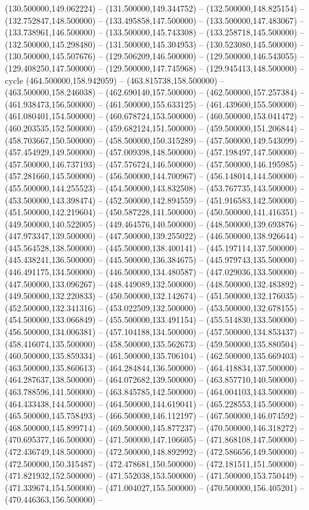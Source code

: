    (130.500000,149.062224) -- (131.500000,149.344752) -- (132.500000,148.825154) -- (132.752847,148.500000) -- (133.495858,147.500000) -- (133.500000,147.483067) -- (133.738961,146.500000) -- (133.500000,145.743308) -- (133.258718,145.500000) -- (132.500000,145.298480) -- (131.500000,145.304953) -- (130.523080,145.500000) -- (130.500000,145.507676) -- (129.506209,146.500000) -- (129.500000,146.543055) -- (129.408250,147.500000) -- (129.500000,147.745968) -- (129.945413,148.500000) -- cycle
   (464.500000,158.942059) -- (463.815738,158.500000) -- (463.500000,158.246038) -- (462.690140,157.500000) -- (462.500000,157.257384) -- (461.938473,156.500000) -- (461.500000,155.633125) -- (461.439600,155.500000) -- (461.080401,154.500000) -- (460.678724,153.500000) -- (460.500000,153.041472) -- (460.203535,152.500000) -- (459.682124,151.500000) -- (459.500000,151.206844) -- (458.703667,150.500000) -- (458.500000,150.315289) -- (457.500000,149.543099) -- (457.454929,149.500000) -- (457.009398,148.500000) -- (457.198497,147.500000) -- (457.500000,146.737193) -- (457.576724,146.500000) -- (457.500000,146.195985) -- (457.281660,145.500000) -- (456.500000,144.700967) -- (456.148014,144.500000) -- (455.500000,144.255523) -- (454.500000,143.832508) -- (453.767735,143.500000) -- (453.500000,143.398474) -- (452.500000,142.894559) -- (451.916583,142.500000) -- (451.500000,142.219604) -- (450.587228,141.500000) -- (450.500000,141.416351) -- (449.500000,140.522005) -- (449.464576,140.500000) -- (448.500000,139.693876) -- (447.973347,139.500000) -- (447.500000,139.255022) -- (446.500000,138.926644) -- (445.564528,138.500000) -- (445.500000,138.400141) -- (445.197114,137.500000) -- (445.438241,136.500000) -- (445.500000,136.384675) -- (445.979743,135.500000) -- (446.491175,134.500000) -- (446.500000,134.480587) -- (447.029036,133.500000) -- (447.500000,133.096267) -- (448.449089,132.500000) -- (448.500000,132.483892) -- (449.500000,132.220833) -- (450.500000,132.142674) -- (451.500000,132.176035) -- (452.500000,132.341316) -- (453.022509,132.500000) -- (453.500000,132.678155) -- (454.500000,133.066849) -- (455.500000,133.491154) -- (455.514830,133.500000) -- (456.500000,134.006381) -- (457.104188,134.500000) -- (457.500000,134.853437) -- (458.416074,135.500000) -- (458.500000,135.562673) -- (459.500000,135.880504) -- (460.500000,135.859334) -- (461.500000,135.706104) -- (462.500000,135.669403) -- (463.500000,135.860613) -- (464.284844,136.500000) -- (464.418834,137.500000) -- (464.287637,138.500000) -- (464.072682,139.500000) -- (463.857710,140.500000) -- (463.788596,141.500000) -- (463.845785,142.500000) -- (464.004103,143.500000) -- (464.433438,144.500000) -- (464.500000,144.619041) -- (465.228553,145.500000) -- (465.500000,145.758493) -- (466.500000,146.112197) -- (467.500000,146.074592) -- (468.500000,145.899714) -- (469.500000,145.877237) -- (470.500000,146.318272) -- (470.695377,146.500000) -- (471.500000,147.106605) -- (471.868108,147.500000) -- (472.436749,148.500000) -- (472.500000,148.892992) -- (472.586656,149.500000) -- (472.500000,150.315487) -- (472.478681,150.500000) -- (472.181511,151.500000) -- (471.821932,152.500000) -- (471.552038,153.500000) -- (471.500000,153.750449) -- (471.339674,154.500000) -- (471.004027,155.500000) -- (470.500000,156.405201) -- (470.446363,156.500000) -- 